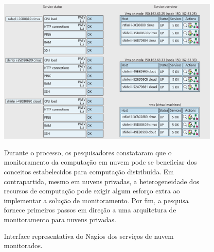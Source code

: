 \documentclass[12pt]{article}
\begin{document}
\begin{figure}[H]
    \includegraphics[width=\linewidth]{interface.png}
    \caption{Interface representativa do Nagios dos serviços de nuvem monitorados.}
Durante o processo, os pesquisadores constataram que o monitoramento da computação em nuvem pode se beneficiar dos conceitos estabelecidos para computação distribuída. Em contrapartida, mesmo em nuvens privadas, a heterogeneidade dos recursos de computação pode exigir algum esforço extra ao implementar a solução de monitoramento. Por fim, a pesquisa fornece primeiros passos em direção a uma arquitetura de monitoramento para nuvens privadas. 
    
\end{figure}

\nocite{*}
\medskip



\end{document}
